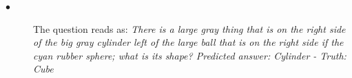 \documentclass[final,paperwidth=36in,paperheight=48in,portrait,fontscale=0.36]{baposter}
\begin{document}
\begin{poster}
{\begin{figure}[H]
	
\end{figure}

\begin{description}
	\item[$\bullet$] The question reads as: \textit{There is a large gray thing that is on the right side of the big gray cylinder left of the large ball that is on the right side if the cyan rubber sphere; what is its shape? Predicted answer: Cylinder - Truth: Cube}
	
\end{description}



}


\end{poster}
\end{document}
